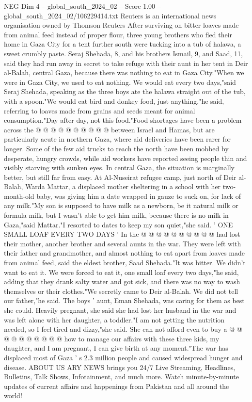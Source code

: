 \begin{textsample}{NEG Dim 4 – global\_south\_2024\_02 – Score 1.00 – global\_south\_2024\_02/106229414.txt}  \label{ex:f4_neg_386}
Reuters is an international news organisation owned by Thomson Reuters After surviving on bitter loaves made from animal feed instead of proper flour, three young brothers who fled their home in Gaza City for a tent further south were tucking into a tub of halawa, a sweet crumbly paste.
Seraj Shehada, 8, and his brothers Ismail, 9, and Saad, 11, said they had run away in secret to take refuge with their aunt in her tent in Deir al-Balah, central Gaza, because there was nothing to eat in Gaza City."When we were in Gaza City, we used to eat nothing.
We would eat every two days,"said Seraj Shehada, speaking as the three boys ate the halawa straight out of the tub, with a spoon."We would eat bird and donkey food, just anything,"he said, referring to loaves made from grains and seeds meant for animal consumption."Day after day, not this food."Food shortages have been a problem across the @ @ @ @ @ @ @ @ @ @ between Israel and Hamas, but are particularly acute in northern Gaza, where aid deliveries have been rarer for longer.
Some of the few aid trucks to reach the north have been mobbed by desperate, hungry crowds, while aid workers have reported seeing people thin and visibly starving with sunken eyes.
In central Gaza, the situation is marginally better, but still far from easy.
At Al-Nuseirat refugee camp, just north of Deir al-Balah, Warda Mattar, a displaced mother sheltering in a school with her two-month-old baby, was giving him a date wrapped in gauze to suck on, for lack of any milk."My son is supposed to have milk as a newborn, be it natural milk or formula milk, but I wasn't able to get him milk, because there is no milk in Gaza,"said Mattar."I resorted to dates to keep my son quiet,"she said. ' ONE SMALL LOAF EVERY TWO DAYS ' In the @ @ @ @ @ @ @ @ @ @ had lost their mother, another brother and several aunts in the war.
They were left with their father and grandmother, and almost nothing to eat apart from loaves made from animal feed, said the eldest brother, Saad Shehada."It was bitter.
We didn't want to eat it.
We were forced to eat it, one small loaf every two days,"he said, adding that they drank salty water and got sick, and there was no way to wash themselves or their clothes."We secretly came to Deir al-Balah.
We did not tell our father,"he said.
The boys ' aunt, Eman Shehada, was caring for them as best she could.
Heavily pregnant, she said she had lost her husband in the war and was left alone with her daughter, a toddler."I am not getting the nutrition needed, so I feel tired and dizzy,"she said.
She can not afford even to buy a @ @ @ @ @ @ @ @ @ @ how to manage our affairs with these three kids, my daughter, and I am pregnant, I can give birth at any moment."The war has displaced most of Gaza ' s 2.3 million people and caused widespread hunger and disease.
ABOUT US ARY NEWS brings you 24/7 Live Streaming, Headlines, Bulletins, Talk Shows, Infotainment, and much more.
Watch minute-by-minute updates of current affairs and happenings from Pakistan and all around the world!

\end{textsample}

